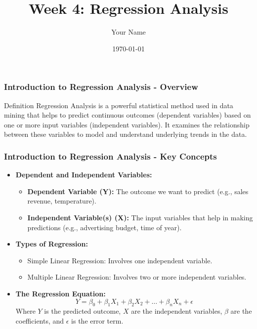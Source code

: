 \documentclass{beamer}
\title{Week 4: Regression Analysis}
\author{Your Name}
\institute{Your Institution}
\date{\today}
\begin{document}
\frame{\titlepage}

\begin{frame}[fragile]
    \frametitle{Introduction to Regression Analysis - Overview}
    \begin{block}{Definition}
        Regression Analysis is a powerful statistical method used in data mining that helps to predict continuous outcomes (dependent variables) based on one or more input variables (independent variables). It examines the relationship between these variables to model and understand underlying trends in the data.
    \end{block}
\end{frame}

\begin{frame}[fragile]
    \frametitle{Introduction to Regression Analysis - Key Concepts}
    \begin{itemize}
        \item \textbf{Dependent and Independent Variables:}
        \begin{itemize}
            \item \textbf{Dependent Variable (Y):} The outcome we want to predict (e.g., sales revenue, temperature).
            \item \textbf{Independent Variable(s) (X):} The input variables that help in making predictions (e.g., advertising budget, time of year).
        \end{itemize}
        
        \item \textbf{Types of Regression:}
        \begin{itemize}
            \item Simple Linear Regression: Involves one independent variable.
            \item Multiple Linear Regression: Involves two or more independent variables.
        \end{itemize}

        \item \textbf{The Regression Equation:}
        \begin{equation}
            Y = \beta_0 + \beta_1X_1 + \beta_2X_2 + \ldots + \beta_nX_n + \epsilon
        \end{equation}
        Where \(Y\) is the predicted outcome, \(X\) are the independent variables, \(\beta\) are the coefficients, and \(\epsilon\) is the error term.
    \end{itemize}
\end{frame}
\end{document}
